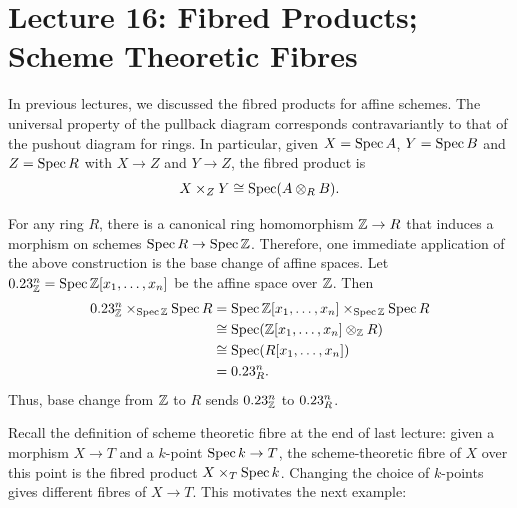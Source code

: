 \newpage

\section*{Lecture 16: Fibred Products; Scheme Theoretic Fibres}

\indent\indent In previous lectures, we discussed the fibred products for affine schemes. The universal property of the pullback diagram corresponds contravariantly to that of the pushout diagram for rings. In particular, given $X = \operatorname{Spec} A$, $Y = \operatorname{Spec} B$ and $Z = \operatorname{Spec} R$ with $X \to Z$ and $Y \to Z$, the fibred product is
\[
    X \times_Z Y \cong \operatorname{Spec} (A \otimes_R B).
\]

\begin{example} 
    \label{ex:base-change-affine-space}
    For any ring $R$, there is a canonical ring homomorphism $\mathbb{Z} \to R$ that induces a morphism on schemes $\operatorname{Spec} R \to \operatorname{Spec} \mathbb{Z}$. Therefore, one immediate application of the above construction is the base change of affine spaces. Let $0.23_{\mathbb{Z}}^n = \operatorname{Spec} \mathbb{Z}[x_1, \dots, x_n]$ be the affine space over $\mathbb{Z}$. Then
    \[
        \begin{aligned}
            0.23_{\mathbb{Z}}^n \times_{\operatorname{Spec} \mathbb{Z}} \operatorname{Spec} R 
            & = \operatorname{Spec} \mathbb{Z}[x_1, \dots, x_n] \times_{\operatorname{Spec} \mathbb{Z}} \operatorname{Spec} R \\
            & \cong \operatorname{Spec}(\mathbb{Z}[x_1, \dots, x_n] \otimes_{\mathbb{Z}} R) \\
            & \cong \operatorname{Spec}(R[x_1, \dots, x_n]) \\
            & = 0.23_{R}^n.
        \end{aligned}
    \]
    Thus, base change from $\mathbb{Z}$ to $R$ sends $0.23_{\mathbb{Z}}^n$ to $0.23_R^n$.
\end{example}

Recall the definition of scheme theoretic fibre at the end of last lecture: given a morphism $X \to T$ and a $k$-point $\operatorname{Spec} k \to T$, the scheme-theoretic fibre of $X$ over this point is the fibred product $X \times_T \operatorname{Spec} k$. Changing the choice of $k$-points gives different fibres of $X \to T$. This motivates the next example:

